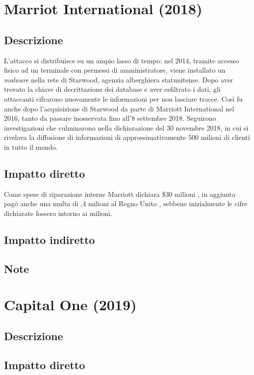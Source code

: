 \documentclass[12pt,a4paper,openright,twoside]{report}
\begin{document}
\section{Marriot International (2018)}
\subsection{Descrizione}
L'attacco si distribuisce su un ampio lasso di tempo: nel 2014, tramite accesso fisico ad un terminale con permessi di amministratore, viene installato un \textit{malware} nella rete di Starwood, agenzia alberghiera statunitense. Dopo aver trovato la chiave di decrittazione dei database e aver esfiltrato i dati, gli attaccanti cifrarono nuovamente le informazioni per non lasciare tracce. Cos\`i fu anche dopo l'acquisizione di Starwood da parte di Marriott International nel 2016, tanto da passare inosservata fino all'8 settembre 2018. Seguirono investigazioni che culminarono nella dichiarazione del 30 novembre 2018, in cui si rivelava la diffusione di informazioni di approssimativamente $500$ milioni di clienti in tutto il mondo\cite{Marriott_ResGate}\cite{Marriott_customer_perception}.\\ 
\subsection{Impatto diretto}
Come spese di riparazione interne Marriott dichiara \$30 milioni \cite{Marriott_ResGate}, in aggiunta pag\`o anche una multa di ,4 milioni al Regno Unito \cite{Marriott_actual_fine}, sebbene  inizialmente le cifre dichiarate fossero intorno ai  milioni.\\ 
\subsection{Impatto indiretto}

\subsection{Note}
\section{Capital One (2019)}
\subsection{Descrizione}

\subsection{Impatto diretto}
\end{document}
